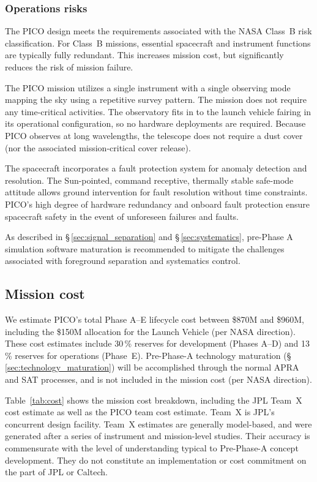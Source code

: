 \subsubsection{Operations risks}
\label{sec:operations_risks} %

The PICO design meets the requirements associated with the NASA
Class~B risk classification. For Class~B missions, essential
spacecraft and instrument functions are typically fully
redundant. This increases mission cost, but significantly reduces the
risk of mission failure.

The PICO mission utilizes a single instrument with a single observing
mode mapping the sky using a repetitive survey pattern. The mission
does not require any time-critical activities. The observatory fits in
to the launch vehicle fairing in its operational configuration, so no
hardware deployments are required. Because PICO observes at long
wavelengths, the telescope does not require a dust cover (nor the
associated mission-critical cover release).

The spacecraft incorporates a fault protection system for anomaly
detection and resolution. The Sun-pointed, command receptive,
thermally stable safe-mode attitude allows ground intervention for
fault resolution without time constraints. PICO's high degree of
hardware redundancy and onboard fault protection ensure spacecraft
safety in the event of unforeseen failures and faults.

As described in \S\,\ref{sec:signal_separation} and
\S\,\ref{sec:systematics}, pre-Phase A simulation software maturation
is recommended to mitigate the challenges associated with foreground
separation and systematics control.

\subsection{Mission cost}
\label{sec:mission_cost} %
\costfootnote

We estimate PICO's total Phase A--E lifecycle cost between \$870M and
\$960M, including the \$150M allocation for the Launch Vehicle (per
NASA direction). These cost estimates include 30\,\% reserves for
development (Phases A--D) and 13\,\% reserves for operations
(Phase~E). Pre-Phase-A technology maturation
(\S\,\ref{sec:technology_maturation}) will be accomplished through the
normal APRA and SAT processes, and is not included in the mission cost
(per NASA direction).

Table~\ref{tab:cost} shows the mission cost breakdown, including the
JPL Team~X cost estimate as well as the PICO team cost estimate. Team~X
 is JPL's concurrent design facility. Team~X estimates are generally
model-based, and were generated after a series of instrument and
mission-level studies. Their accuracy is commensurate with the level
of understanding typical to Pre-Phase-A concept development. They do
not constitute an implementation or cost commitment on the part of JPL
or Caltech.

